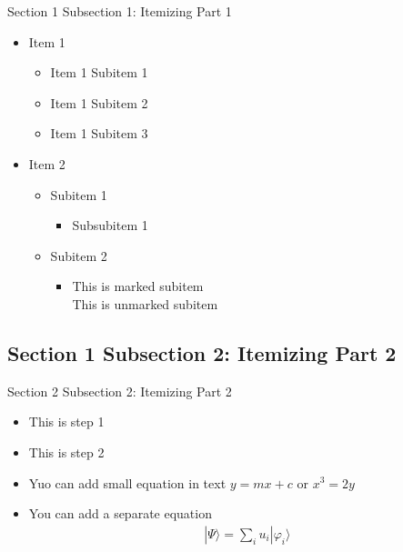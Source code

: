 \documentclass[aspectratio=169, 9pt]{beamer}
\begin{document}
\begin{frame}{Section 1 Subsection 1: Itemizing Part 1}
    \begin{itemize}
     \setlength{\itemsep}{10pt}
        \item Item 1
        \begin{itemize}
            \item Item 1 Subitem 1
            \item Item 1 Subitem 2
            \item Item 1 Subitem 3
        \end{itemize}
        \item Item 2
        \begin{itemize}
            \item Subitem 1
            \begin{itemize}
                \item Subsubitem 1
            \end{itemize}
            \item Subitem 2
            \begin{itemize}
                \item This is marked subitem \\
                This is unmarked subitem
            \end{itemize}
        \end{itemize}
    \end{itemize}
\end{frame}


\subsection{Section 1 Subsection 2: Itemizing Part 2}

\begin{frame}{Section 2 Subsection 2: Itemizing Part 2}
\begin{itemize}
    \item[Step 1] This is step 1
    \item[Step 2] This is step 2
    \item[Step 3] Yuo can add small equation in text $y=mx+c$ or $x^{3}=2y$
    \item[Step 4] You can add a separate equation
        \begin{align*}
        |\Psi \rangle = \sum_{i} u_{i} | \varphi_{i} \rangle 
    \end{align*}
\end{itemize}
\end{frame}
\end{document}
